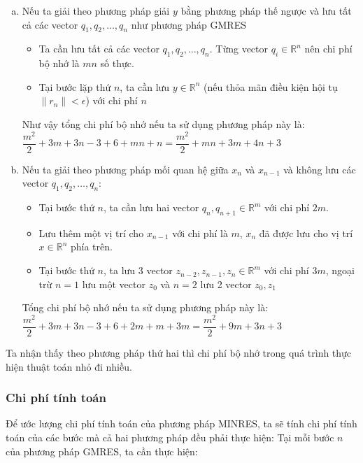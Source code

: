 \documentclass[14pt, a4paper]{article}
\numberwithin{equation}{section}
\numberwithin{algorithm}{section}
\numberwithin{figure}{section}
\numberwithin{dl}{section}
\numberwithin{md}{section}
\numberwithin{bd}{section}
\numberwithin{dn}{section}
\begin{document}
\begin{enumerate}[a)] %
    \item Nếu ta giải theo phương pháp giải $y$ bằng phương pháp thế ngược và lưu tất cả các vector $q_1, q_2, \dots, q_n$ như phương pháp GMRES
    \begin{itemize}
        \item Ta cần lưu tất cả các vector $q_1, q_2, \dots, q_n$. Từng vector $q_i \in \mathbb{R}^n$ nên chi phí bộ nhớ là $mn$ số thực.
        \item Tại bước lặp thứ $n$, ta cần lưu $y \in \mathbb{R}^n$ (nếu thỏa mãn điều kiện hội tụ $\lVert r_n \rVert < \epsilon$) với chi phí $n$
    \end{itemize}
    Như vậy tổng chi phí bộ nhớ nếu ta sử dụng phương pháp này là: $\dfrac{m^2}{2}+3m + 3n-3+6+mn+n=\dfrac{m^2}{2}+mn+3m+4n+3$
    \item Nếu ta giải theo phương pháp mối quan hệ giữa $x_n$ và $x_{n-1}$ và không lưu các vector $q_1, q_2, \dots, q_n$:
    \begin{itemize}
        \item Tại bước thứ $n$, ta cần lưu hai vector $q_{n}, q_{n+1} \in \mathbb{R}^m$ với chi phí $2m$.
        \item Lưu thêm một vị trí cho $x_{n-1}$ với chi phí là $m$, $x_n$ đã được lưu cho vị trí $x \in \mathbb{R}^n$ phía trên.
        \item Tại bước thứ $n$, ta lưu 3 vector $z_{n-2}, z_{n-1}, z_n \in \mathbb{R}^m$ với chi phí $3m$, ngoại trừ $n=1$ lưu một vector $z_0$ và $n=2$ lưu 2 vector $z_0, z_1$
    \end{itemize}
    Tổng chi phí bộ nhớ nếu ta sử dụng phương pháp này là: $\dfrac{m^2}{2}+3m + 3n-3+6+2m + m + 3m=\dfrac{m^2}{2}+9m+3n+3$
\end{enumerate}

Ta nhận thấy theo phương pháp thứ hai thì chi phí bộ nhớ trong quá trình thực hiện thuật toán nhỏ đi nhiều.

\subsubsection{Chi phí tính toán} \label{MINRES-Computation-Cost}

Để ước lượng chi phí tính toán của phương pháp MINRES, ta sẽ tính chi phí tính toán của các bước mà cả hai phương pháp đều phải thực hiện:
Tại mỗi bước $n$ của phương pháp GMRES, ta cần thực hiện:
\end{document}
